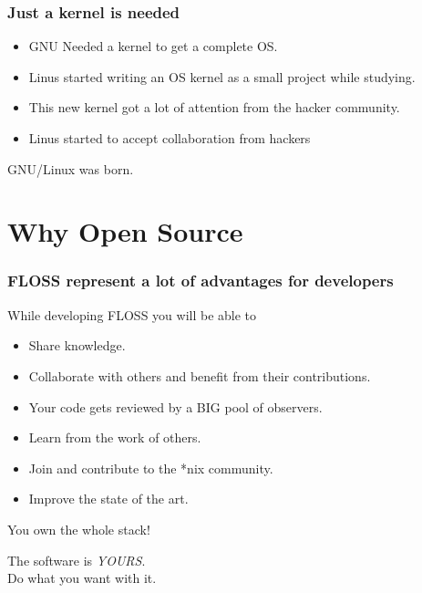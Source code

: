 \documentclass[hyperref={pdfpagelabels=false},xcolor=pst,pdf,fragile]{beamer}
\begin{document}
\begin{frame}
  \frametitle{Just a kernel is needed}

  \begin{itemize}
	  \item GNU Needed a kernel to get a complete OS.
	  \item Linus started writing an OS kernel as a small project while
		  studying.
  \end{itemize}

  \hskip-20pt

  \begin{itemize}
	  \item This new kernel got a lot of attention from the hacker
		  community. 
		  \pause
	  \item \alert{Linus started to accept collaboration from hackers}
  \end{itemize}

  \pause
  \begin{center}
	  GNU/Linux was born.
  \end{center}

\end{frame}

\section{Why Open Source}

\begin{frame}
  \frametitle{FLOSS represent a lot of advantages for developers}

  While developing FLOSS you will be able to
  \begin{itemize}
	\item Share knowledge.
	\item Collaborate with others and benefit from their contributions.
	\item Your code gets reviewed by a BIG pool of observers.
	\pause
	\item Learn from the work of others.
	\item Join and contribute to the *nix community.
	\item Improve the state of the art.
  \end{itemize}

  \begin{alertblock}{
		  \begin{center}
			  You own the whole stack!
		  \end{center}
  }
	  \begin{center}
		  The software is \emph{YOURS}.\\Do what you want with it.
	  \end{center}
  \end{alertblock}

\end{frame}
\end{document}
